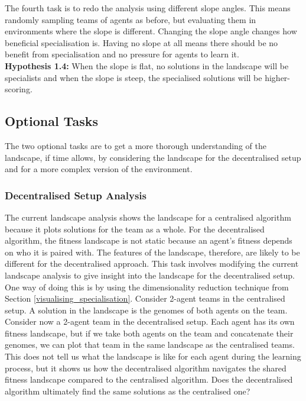 \documentclass[12pt]{article}
\begin{document}
The fourth task is to redo the analysis using different slope angles. 
This means randomly sampling teams of agents as before, but evaluating them in environments where the slope is different. 
Changing the slope angle changes how beneficial specialisation is. 
Having no slope at all means there should be no benefit from specialisation and no pressure for agents to learn it.\\

\textbf{Hypothesis 1.4:} When the slope is flat, no solutions in the landscape will be specialists and when the slope is steep, the specialised solutions will be higher-scoring.\\

\subsection{Optional Tasks}

The two optional tasks are to get a more thorough understanding of the landscape, if time allows, by considering the landscape for the decentralised setup and for a more complex version of the environment.\\

\subsubsection{Decentralised Setup Analysis} 

The current landscape analysis shows the landscape for a centralised algorithm because it plots solutions for the team as a whole. 
For the decentralised algorithm, the fitness landscape is not static because an agent’s fitness depends on who it is paired with. 
The features of the landscape, therefore, are likely to be different for the decentralised approach. 
This task involves modifying the current landscape analysis to give insight into the landscape for the decentralised setup.
One way of doing this is by using the dimensionality reduction technique from Section \ref{visualising_specialisation}.
Consider 2-agent teams in the centralised setup.
A solution in the landscape is the genomes of both agents on the team.
Consider now a 2-agent team in the decentralised setup.
Each agent has its own fitness landscape, but if we take both agents on the team and concatenate their genomes, we can plot that team in the same landscape as the centralised teams.
This does not tell us what the landscape is like for each agent during the learning process, but it shows us how the decentralised algorithm navigates the shared fitness landscape compared to the centralised algorithm.
Does the decentralised algorithm ultimately find the same solutions as the centralised one?\\
\end{document}
